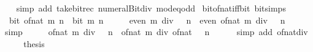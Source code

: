 \begin{isabellebody}
%
\isadelimproof
\ \ %
\endisadelimproof
%
\isatagproof
{}\isamarkupfalse%
\ {\isacharparenleft}{\kern0pt}simp\ add{\isacharcolon}{\kern0pt}\ take{\isacharunderscore}{\kern0pt}bit{\isacharunderscore}{\kern0pt}rec\ numeral{\isacharunderscore}{\kern0pt}Bit{}{\isacharunderscore}{\kern0pt}div{\isacharunderscore}{\kern0pt}{}\ mod{\isacharunderscore}{\kern0pt}{}{\isacharunderscore}{\kern0pt}eq{\isacharunderscore}{\kern0pt}odd{\isacharparenright}{\kern0pt}%
\endisatagproof
{\isafoldproof}%
%
\isadelimproof
\isanewline
%
\endisadelimproof
\isanewline
{}\isamarkupfalse%
\ bit{\isacharunderscore}{\kern0pt}of{\isacharunderscore}{\kern0pt}nat{\isacharunderscore}{\kern0pt}iff{\isacharunderscore}{\kern0pt}bit\ {\isacharbrackleft}{\kern0pt}bit{\isacharunderscore}{\kern0pt}simps{\isacharbrackright}{\kern0pt}{\isacharcolon}{\kern0pt}\isanewline
\ \ {\isacartoucheopen}bit\ {\isacharparenleft}{\kern0pt}of{\isacharunderscore}{\kern0pt}nat\ m{\isacharparenright}{\kern0pt}\ n\ {\isasymlongleftrightarrow}\ bit\ m\ n{\isacartoucheclose}\isanewline
%
\isadelimproof
%
\endisadelimproof
%
\isatagproof
{}\isamarkupfalse%
\ {\isacharminus}{\kern0pt}\isanewline
\ \ \isamarkupfalse%
\ {\isacartoucheopen}even\ {\isacharparenleft}{\kern0pt}m\ div\ {}\ {\isacharcircum}{\kern0pt}\ n{\isacharparenright}{\kern0pt}\ {\isasymlongleftrightarrow}\ even\ {\isacharparenleft}{\kern0pt}of{\isacharunderscore}{\kern0pt}nat\ {\isacharparenleft}{\kern0pt}m\ div\ {}\ {\isacharcircum}{\kern0pt}\ n{\isacharparenright}{\kern0pt}{\isacharparenright}{\kern0pt}{\isacartoucheclose}\isanewline
\ \ \ \ \isamarkupfalse%
\ simp\isanewline
\ \ \isamarkupfalse%
\ \isamarkupfalse%
\ {\isacartoucheopen}of{\isacharunderscore}{\kern0pt}nat\ {\isacharparenleft}{\kern0pt}m\ div\ {}\ {\isacharcircum}{\kern0pt}\ n{\isacharparenright}{\kern0pt}\ {\isacharequal}{\kern0pt}\ of{\isacharunderscore}{\kern0pt}nat\ m\ div\ of{\isacharunderscore}{\kern0pt}nat\ {\isacharparenleft}{\kern0pt}{}\ {\isacharcircum}{\kern0pt}\ n{\isacharparenright}{\kern0pt}{\isacartoucheclose}\isanewline
\ \ \ \ \isamarkupfalse%
\ {\isacharparenleft}{\kern0pt}simp\ add{\isacharcolon}{\kern0pt}\ of{\isacharunderscore}{\kern0pt}nat{\isacharunderscore}{\kern0pt}div{\isacharparenright}{\kern0pt}\isanewline
\ \ \isamarkupfalse%
\ \isamarkupfalse%
\ {\isacharquery}{\kern0pt}thesis\isanewline
\ \ \ \ \isamarkupfalse%

\end{isabellebody}
